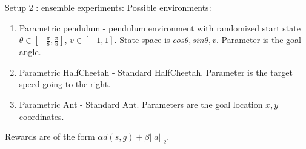 \documentclass[letterpaper]{article}
\theoremstyle{definition}
\begin{document}
%   		
%		

Setup 2 : ensemble experiments:
Possible environments:
\begin{enumerate}
	\item Parametric pendulum - pendulum environment with randomized start state $\theta \in [-\frac{\pi}{8}, \frac{\pi}{8}]$, $v\in[-1,1]$. State space is $cos\theta,sin\theta,v$. Parameter is the goal angle.
	\item Parametric HalfCheetah - Standard HalfCheetah. Parameter is the target speed going to the right. 
	\item Parametric Ant - Standard Ant. Parameters are the goal location $x,y$ coordinates.
\end{enumerate}
Rewards are of the form $\alpha d(s,g) + \beta ||a||_2$.
\end{document}
